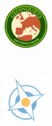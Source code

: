 \documentclass[11pt,a5]{article}
\begin{document}
\begin{figure}[h]
        \centering
        \begin{subfigure}[b]{0.12\textwidth}
                \centering
                \includegraphics[width=\textwidth]{img/logo_geoinquiets}
        \end{subfigure}%
        ~
        \begin{subfigure}[b]{0.12\textwidth}
                \centering
                \includegraphics[width=\textwidth]{img/logo_geoinquietosbas}

\end{subfigure}
\end{figure}
\end{document}
